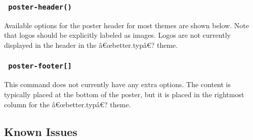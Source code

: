 \begin{Shaded}
\begin{Highlighting}[]
\NormalTok{\#normal{-}box(color: none)[}
\NormalTok{]}

\NormalTok{\#focus{-}box(color: none)[}
\NormalTok{]}
\end{Highlighting}
\end{Shaded}

\subsubsection{\texorpdfstring{\texttt{\ poster-header()\ }}{ poster-header() }}\label{poster-header}

Available options for the poster header for most themes are shown below.
Note that logos should be explicitly labeled as images. Logos are not
currently displayed in the header in the â€œbetter.typâ€? theme.

\begin{Shaded}
\begin{Highlighting}[]
\NormalTok{)}
\end{Highlighting}
\end{Shaded}

\subsubsection{\texorpdfstring{\texttt{\ poster-footer{[}{]}\ }}{ poster-footer{[}{]} }}\label{poster-footer}

This command does not currently have any extra options. The content is
typically placed at the bottom of the poster, but it is placed in the
rightmost column for the â€œbetter.typâ€? theme.

\begin{Shaded}
\begin{Highlighting}[]
\NormalTok{\#poster{-}footer[}
\NormalTok{]}
\end{Highlighting}
\end{Shaded}

\subsection{Known Issues}\label{known-issues}

